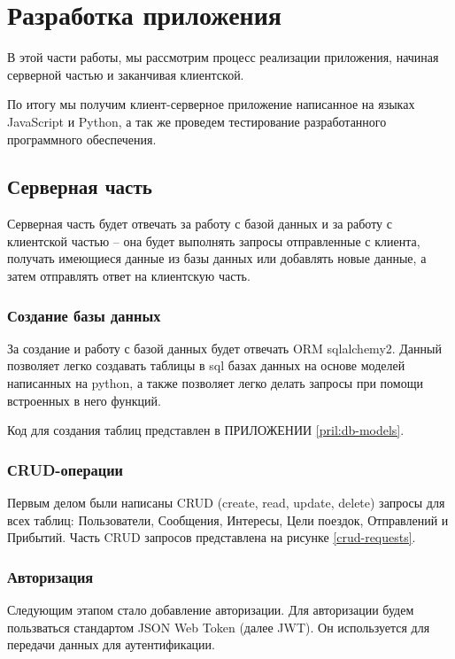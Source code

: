 \section{Разработка приложения}

В этой части работы, мы рассмотрим процесс реализации приложения, начиная серверной частью и заканчивая клиентской.

По итогу мы получим клиент-серверное приложение написанное на языках JavaScript и Python, а так же проведем тестирование разработанного программного обеспечения.

\subsection{Серверная часть}

Серверная часть будет отвечать за работу с базой данных и за работу с клиентской частью -- она будет выполнять запросы отправленные с клиента, получать имеющиеся данные из базы данных или добавлять новые данные, а затем отправлять ответ на клиентскую часть.

\subsubsection{Создание базы данных}

За создание и работу с базой данных будет отвечать ORM sqlalchemy2. Данный позволяет легко создавать таблицы в sql базах данных на основе моделей написанных на python, а также позволяет легко делать запросы при помощи встроенных в него функций.

Код для создания таблиц представлен в ПРИЛОЖЕНИИ \ref{pril:db-models}.

\subsubsection{СRUD-операции}

Первым делом были написаны CRUD (create, read, update, delete) запросы для всех таблиц: Пользователи, Сообщения, Интересы, Цели поездок, Отправлений и Прибытий. Часть CRUD запросов представлена на рисунке \ref{crud-requests}.


\subsubsection{Авторизация}

Следующим этапом стало добавление авторизации. Для авторизации будем пользваться стандартом JSON Web Token (далее JWT). Он используется для передачи данных для аутентификации.

